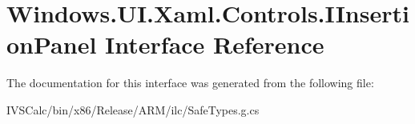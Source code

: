 \hypertarget{interface_windows_1_1_u_i_1_1_xaml_1_1_controls_1_1_i_insertion_panel}{}\section{Windows.\+U\+I.\+Xaml.\+Controls.\+I\+Insertion\+Panel Interface Reference}
\label{interface_windows_1_1_u_i_1_1_xaml_1_1_controls_1_1_i_insertion_panel}


The documentation for this interface was generated from the following file\+:\begin{DoxyCompactItemize}
\item 
I\+V\+S\+Calc/bin/x86/\+Release/\+A\+R\+M/ilc/Safe\+Types.\+g.\+cs\end{DoxyCompactItemize}
